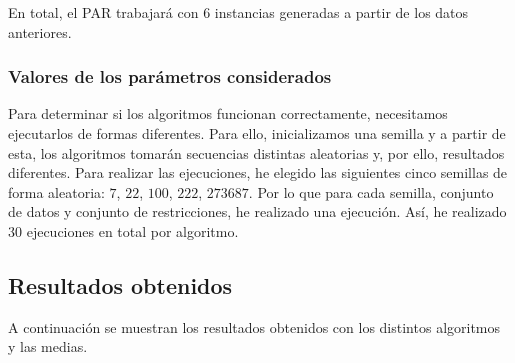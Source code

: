 En total, el PAR trabajará con 6 instancias generadas a partir de los datos anteriores.

\subsubsection{Valores de los parámetros considerados}

Para determinar si los algoritmos funcionan correctamente, necesitamos ejecutarlos de formas diferentes. Para ello, inicializamos 
una semilla y a partir de esta, los algoritmos tomarán secuencias distintas aleatorias y, por ello, resultados diferentes.
Para realizar las ejecuciones, he elegido las siguientes cinco semillas de forma aleatoria: $7$, $22$, $100$, $222$, $273687$.
Por lo que para cada semilla, conjunto de datos y conjunto de restricciones, he realizado una ejecución. Así, he realizado $30$ ejecuciones en total por algoritmo.

\subsection{Resultados obtenidos}

A continuación se muestran los resultados obtenidos con los distintos algoritmos y las medias.

